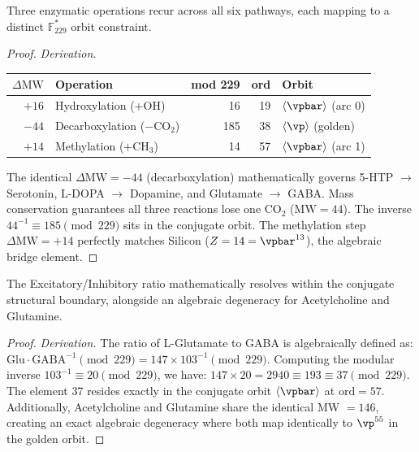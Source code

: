 \begin{theorem}
Three enzymatic operations recur across all six pathways, each mapping to a distinct $\mathbb{F}_{229}^*$ orbit constraint.
\begin{proof}
\emph{Derivation.}
\begin{center}
\begin{tabular}{@{}rlrrl@{}}
\toprule
$\Delta\mathrm{MW}$ & \textbf{Operation} & \textbf{mod 229} & \textbf{ord} & \textbf{Orbit} \\
\midrule
$+16$ & Hydroxylation (+OH) & 16 & 19 & $\langle\vpbar\rangle$ (arc 0) \\
$-44$ & Decarboxylation ($-\mathrm{CO}_2$) & 185 & 38 & $\langle\vp\rangle$ (golden) \\
$+14$ & Methylation (+$\mathrm{CH}_3$) & 14 & 57 & $\langle\vpbar\rangle$ (arc 1) \\
\bottomrule
\end{tabular}
\end{center}
The identical $\Delta\mathrm{MW} = -44$ (decarboxylation) mathematically governs 5-HTP $\to$ Serotonin, L-DOPA $\to$ Dopamine, and Glutamate $\to$ GABA. Mass conservation guarantees all three reactions lose one CO$_2$ ($\mathrm{MW} = 44$). The inverse $44^{-1} \equiv 185 \pmod{229}$ sits in the conjugate orbit. The methylation step $\Delta\mathrm{MW} = +14$ perfectly matches Silicon ($Z = 14 = \vpbar^{13}$), the algebraic bridge element.
\qedhere
\end{proof}
\end{theorem}

\begin{theorem}
The Excitatory/Inhibitory ratio mathematically resolves within the conjugate structural boundary, alongside an algebraic degeneracy for Acetylcholine and Glutamine.
\begin{proof}
\emph{Derivation.} The ratio of L-Glutamate to GABA is algebraically defined as:
$\mathrm{Glu} \cdot \mathrm{GABA}^{-1} \pmod{229} = 147 \times 103^{-1} \pmod{229}$.
Computing the modular inverse $103^{-1} \equiv 20 \pmod{229}$, we have:
$147 \times 20 = 2940 \equiv 193 \equiv 37 \pmod{229}$.
The element 37 resides exactly in the conjugate orbit $\langle\vpbar\rangle$ at $\mathrm{ord} = 57$. Additionally, Acetylcholine and Glutamine share the identical MW $= 146$, creating an exact algebraic degeneracy where both map identically to $\vp^{55}$ in the golden orbit.
\qedhere
\end{proof}
\end{theorem}

